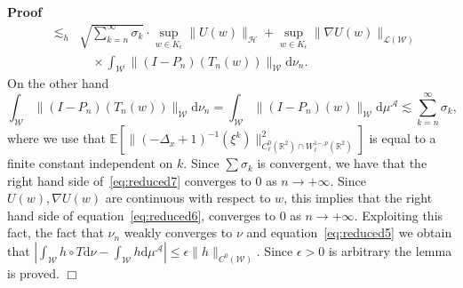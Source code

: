 \documentclass[a4paper,10pt]{article}
\newcommand{\mathd}{\mathrm{d}}
\newenvironment{proof}{\noindent\textbf{Proof\ }}{\hspace*{\fill}$\Box$\medskip}
\begin{document}
\begin{proof}
\begin{eqnarray}
    & \lesssim_h & \sqrt{\sum_{k = n}^{\infty} \sigma_k} \cdot \sup_{w \in
    K_{\epsilon}} \| U (w) \|_{\mathcal{H}} + \sup_{w \in K_{\epsilon}} \|
    \nabla U (w) \|_{\mathcal{L} (\mathcal{W})} \nonumber\\
    &  & \quad \times \int_{\mathcal{W}} \| (I - P_n) (T_n (w))
    \|_{\mathcal{W}} \mathd \nu_n .  \label{eq:reduced6}
  \end{eqnarray}
  On the other hand
  \begin{equation}
    \int_{\mathcal{W}} \| (I - P_n) (T_n (w)) \|_{\mathcal{W}} \mathd \nu_n =
    \int_{\mathcal{W}} \| (I - P_n) (w) \|_{\mathcal{W}} \mathd
    \mu^{\mathcal{A}} \lesssim \sum_{k = n}^{\infty} \sigma_k
    \label{eq:reduced7},
  \end{equation}
  where we use that $\mathbb{E} [\| (- \Delta_x + 1)^{- 1} (\xi^k)
  \|^2_{C^0_{\ell} (\mathbb{R}^2) \cap W^{1 -, p}_{\ell} (\mathbb{R}^2)}]$ is
  equal to a finite constant independent on $k$. Since $\sum \sigma_k$ is
  convergent, we have that the right hand side of~{\eqref{eq:reduced7}}
  converges to 0 as $n \rightarrow + \infty$. Since $U (w), \nabla U (w)$ are
  continuous with respect to $w$, this implies that the right hand side of
  equation~{\eqref{eq:reduced6}}, converges to 0 as $n \rightarrow + \infty$.
  Exploiting this fact, the fact that $\nu_n$ weakly converges to $\nu$ and
  equation~{\eqref{eq:reduced5}} we obtain that $\left| \int_{\mathcal{W}} h
  \circ T \mathd \nu - \int_{\mathcal{W}} h \mathd \mu^{\mathcal{A}} \right|
  \leqslant \epsilon \| h \|_{C^0 (\mathcal{W})}$. Since $\epsilon > 0$ is
  arbitrary the lemma is proved.
\end{proof}
\end{document}
